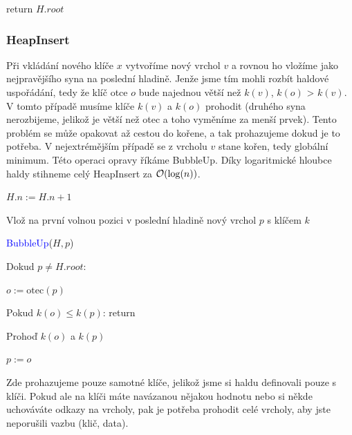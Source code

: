 \begin{pseudocode}
\item return $H.root$
\end{pseudocode} \medskip

\subsubsection{HeapInsert}
Při vkládání nového klíče $x$ vytvoříme nový vrchol $v$ a rovnou ho vložíme jako nejpravějšího syna na poslední hladině. Jenže jsme tím mohli rozbít haldové uspořádání, tedy že klíč otce $o$ bude najednou větší než $k(v)$, $k(o)$ > $k(v)$. V tomto případě musíme klíče $k(v)$ a $k(o)$ prohodit (druhého syna nerozbijeme, jelikož je větší než otec a toho vyměníme za menší prvek). Tento problém se může opakovat až cestou do kořene, a tak prohazujeme dokud je to potřeba. V nejextrémějším případě se z vrcholu $v$ stane kořen, tedy globální minimum. Této operaci opravy říkáme BubbleUp. Díky logaritmické hloubce haldy stihneme celý HeapInsert za $\mathcal{O}(\log(n))$.\bigskip

\begin{pseudocode}
\item $H.n := H.n + 1$
\item Vlož na první volnou pozici v poslední hladině nový vrchol $p$ s klíčem $k$
\item \textcolor{blue}{BubbleUp}($H, p$)
\end{pseudocode} \bigskip

\begin{pseudocode}
\item Dokud $p \neq H.root$:
\item \tab $o := \text{otec}(p)$
\item \tab Pokud $k(o) \le k(p)$: return \hfill {\color{gray}{//Halda je již opravená}}
\item \tab Prohoď $k(o)$ a $k(p)$
\item \tab $p := o$
\end{pseudocode} \bigskip

\begin{remark}
    Zde prohazujeme pouze samotné klíče, jelikož jsme si haldu definovali pouze s klíči. Pokud ale na klíči máte navázanou nějakou hodnotu nebo si někde uchováváte odkazy na vrcholy, pak je potřeba prohodit celé vrcholy, aby jste neporušili vazbu (klič, data).
\end{remark} \bigskip

